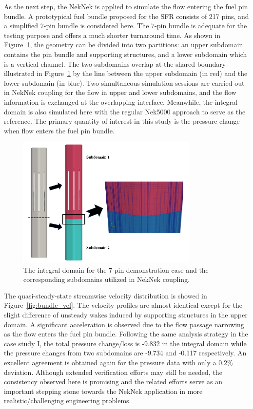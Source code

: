 As the next step, the NekNek is applied to simulate the flow entering the fuel pin bundle.
A prototypical fuel bundle proposed for the SFR consists of 217 pins, and a simplified 7-pin bundle is considered here.
The 7-pin bundle is adequate for the testing purpose and offers a much shorter turnaround time.
As shown in Figure~\ref{fig:bundle_domain}, the geometry can be divided into two partitions: an upper subdomain contains the pin bundle and supporting structures, and a lower subdomain which is a vertical channel.
The two subdomains overlap at the shared boundary illustrated in Figure~\ref{fig:bundle_domain} by the line between the upper subdomain (in red) and the lower subdomain (in blue).
Two simultaneous simulation sessions are carried out in NekNek coupling for the flow in upper and lower subdomains, and the flow information is exchanged at the overlapping interface.
Meanwhile, the integral domain is also simulated here with the regular Nek5000 approach to serve as the reference.
The primary quantity of interest in this study is the pressure change when flow enters the fuel pin bundle.

\begin{figure}[!ht]
\centering
\includegraphics[width=0.8\textwidth]{./figures/bundle_neknek_domain.png}
\caption{The integral domain for the 7-pin demonstration case and the corresponding subdomains utilized in NekNek coupling. }
\label{fig:bundle_domain}
\end{figure}

The quasi-steady-state streamwise velocity distribution is showed in Figure~\ref{fig:bundle_vel}.
The velocity profiles are almost identical except for the slight difference of unsteady wakes induced by supporting structures in the upper domain.
A significant acceleration is observed due to the flow passage narrowing as the flow enters the fuel pin bundle.
Following the same analysis strategy in the case study I, the total pressure change/loss is -9.832 in the integral domain while the pressure changes from two subdomains are -9.734 and -0.117 respectively.
An excellent agreement is obtained again for the pressure data with only a 0.2\% deviation.
Although extended verification efforts may still be needed, the consistency observed here is promising and the related efforts serve as an important stepping stone towards the NekNek application in more realistic/challenging engineering problems.

